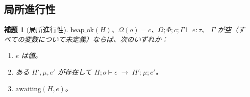 \documentclass[11pt,a4paper]{ltjsarticle}
\newtheorem{lemma}[theorem]{補題}
\theoremstyle{definition}
\theoremstyle{remark}
\newcommand{\Om}{\Omega}          %
\newcommand{\Ph}{\Phi}            %
\newcommand{\jt}[3]{\Om;\Ph;#1;#2 \vdash #3}
\newcommand{\tstep}[6]{#1; #2 \vdash #3 \;\longrightarrow\; #4; #5; #6}
\newcommand{\heapok}{\mathrm{heap\_ok}}
\newcommand{\awaiting}{\mathrm{awaiting}}
\begin{document}
\subsection{局所進行性}

\begin{lemma}[局所進行性]
\label{lem:lp}
$\heapok(H)$、$\Om(o) = c$、$\jt{c}{\Gamma}{e : \tau}$、
$\Gamma$ が空（すべての変数について未定義）ならば、次のいずれか：
\begin{enumerate}
\item $e$ は値。
\item ある $H', \mu, e'$ が存在して $\tstep{H}{o}{e}{H'}{\mu}{e'}$。
\item $\awaiting(H, e)$。
\end{enumerate}
\end{lemma}
\end{document}
